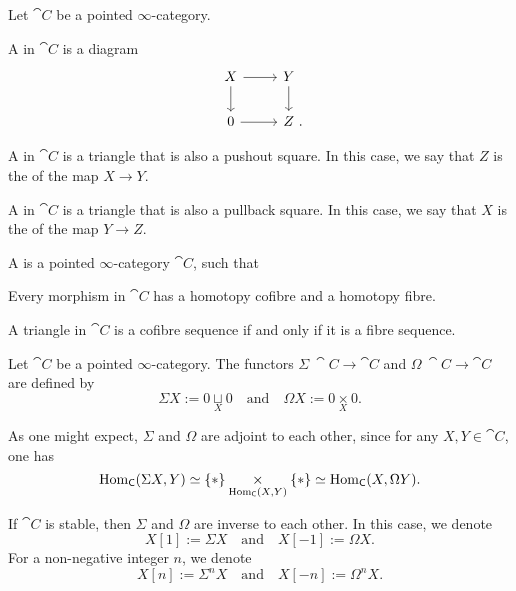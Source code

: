\begin{definition}
    Let $\cat C$ be a pointed $\infty$-category.
    \begin{itms}
        \item A  in $\cat C$ is a diagram 
        \[\begin{tikzcd}
            X\ar[d]\ar[r] & Y\ar[d] \\
            0\ar[r] & Z\rlap{\ .}
        \end{tikzcd}\]
        
        \item A  in $\cat C$
        is a triangle that is also a pushout square.
        In this case, we say that $Z$ is the
         of the map $X\to Y$.
        
        \item A  in $\cat C$
        is a triangle that is also a pullback square.
        In this case, we say that $X$ is the
         of the map $Y\to Z$.
    \end{itms}
\end{definition}

\begin{definition}
    A  is a pointed $\infty$-category $\cat C$,
    such that
    \begin{itms}
        \item Every morphism in $\cat C$ has a homotopy cofibre and a homotopy fibre.
        \item A triangle in $\cat C$ is a cofibre sequence
        if and only if it is a fibre sequence.
    \end{itms}
\end{definition}

\begin{definition}
    Let $\cat C$ be a pointed $\infty$-category.
    The functors $\Sigma\:\cat C\to\cat C$ and $\Omega\:\cat C\to\cat C$
    are defined by 
    \[ \Sigma X:=0\underset{X}{\sqcup}0
    \quad\text{and}\quad
    \Omega X:=0\underset{X}{\times}0. \]
\end{definition}

As one might expect, $\Sigma$ and $\Omega$ are adjoint to each other, 
since for any $X,Y\in\cat C$, one has 
\[ \operatorname{Hom}_{\mathsf{C}}(\Sigma X,Y)\simeq
\{*\}\underset{\operatorname{Hom}_{\mathsf{C}}(X,Y)}{\times}\{*\}
\simeq\operatorname{Hom}_{\mathsf{C}}(X,\Omega Y). \]

If $\cat C$ is stable, then $\Sigma$ and $\Omega$ are inverse to each other.
In this case, we denote 
\[ X[1]:=\Sigma X\quad\text{and}\quad X[-1]:=\Omega X. \]
For a non-negative integer $n$, we denote
\[ X[n]:=\Sigma^nX\quad\text{and}\quad X[-n]:=\Omega^nX. \]

